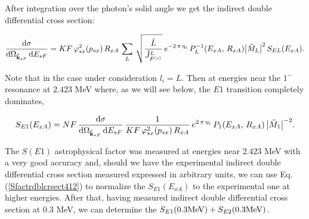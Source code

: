 \documentclass[prl,unsortedaddress,groupedaddress,twocolumn,amsmath,amsfonts,amssymb,showpacs,floatfix,nofootinbib]{revtex4}
\begin{document}
After integration over the photon's solid angle we get the indirect double differential cross section:
\begin{widetext}
\begin{align}
\frac{ {\rm d}\sigma}{  {\rm d}{\Omega}_{  {\rm{\bf {\hat k}}}_{sF} }\,{\rm d}{E_{sF}} }=KF\,\varphi_{sx}^{2}(p_{sx})\,R_{xA}
\,\sum\limits_{L} \,\sqrt{\frac{{\hat L}}{{\hat J}_{F^{(s)}}^{L}}}\,e^{-2\,\pi\,\eta_{i}}\,P_{L}^{-1}(E_{xA},\,R_{xA})\big| {\tilde M}_{L}\big|^{2}\,S_{EL}(E_{xA}).                                
\label{doubledcrsct1}
\end{align}
\end{widetext}
Note that in the case under consideration $l_{i}=L$. 
Then at energies near the $1^{-}$ resonance at $2.423$ MeV where, as we will see below, the $E1$ transition completely dominates,
\begin{widetext}
\begin{align}
 S_{E1}(E_{xA})= NF\,\frac{ {\rm d}\sigma}{  {\rm d}{\Omega}_{  {\rm{\bf {\hat k}}}_{sF} }\, {\rm d}{E_{sF}} }\,\frac{1}{KF\,\varphi_{sx}^{2}(p_{sx})\,R_{xA}}\,e^{2\,\pi\,\eta_{i}}\,P_{1}(E_{xA},\,R_{xA})\,
\big| {\tilde M}_{1} \big|^{-2}.
\label{Sfactrdblcrsect412}
\end{align}
\end{widetext}
The $S(E1)$ astrophysical factor was measured at energies near $2.423$ MeV with a very good accuracy   \cite{redder,assuncao,Schuermann} and, should we have the experimental indirect double differential cross section measured expressed in arbitrary units, we can use Eq. (\ref{Sfactrdblcrsect412}) to normalize the $S_{E1}(E_{xA})$ to the experimental one at higher energies. After that, having 
measured indirect double differential cross section at $0.3$ MeV, we can determine the $S_{E1}(0.3 {\rm MeV}) + S_{E2}(0.3 {\rm MeV})$. 
\end{document}
